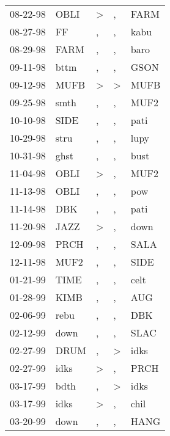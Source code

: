 \begin{supertabular}{lllll}
 08-22-98 &   OBLI &     \textgreater &                , &   FARM \\
 08-27-98 &     FF &                , &                , &   kabu \\
 08-29-98 &   FARM &                , &                , &   baro \\
 09-11-98 &   bttm &                , &                , &   GSON \\
 09-12-98 &   MUFB &     \textgreater &     \textgreater &   MUFB \\
 09-25-98 &   smth &                , &                , &   MUF2 \\
 10-10-98 &   SIDE &                , &                , &   pati \\
 10-29-98 &   stru &                , &                , &   lupy \\
 10-31-98 &   ghst &                , &                , &   bust \\
 11-04-98 &   OBLI &     \textgreater &                , &   MUF2 \\
 11-13-98 &   OBLI &                , &                , &    pow \\
 11-14-98 &    DBK &                , &                , &   pati \\
 11-20-98 &   JAZZ &     \textgreater &                , &   down \\
 12-09-98 &   PRCH &                , &                , &   SALA \\
 12-11-98 &   MUF2 &                , &                , &   SIDE \\
 01-21-99 &   TIME &                , &                , &   celt \\
 01-28-99 &   KIMB &                , &                , &    AUG \\
 02-06-99 &   rebu &                , &                , &    DBK \\
 02-12-99 &   down &                , &                , &   SLAC \\
 02-27-99 &   DRUM &                , &     \textgreater &   idks \\
 02-27-99 &   idks &     \textgreater &                , &   PRCH \\
 03-17-99 &   bdth &                , &     \textgreater &   idks \\
 03-17-99 &   idks &     \textgreater &                , &   chil \\
 03-20-99 &   down &                , &                , &   HANG \\

\end{supertabular}
